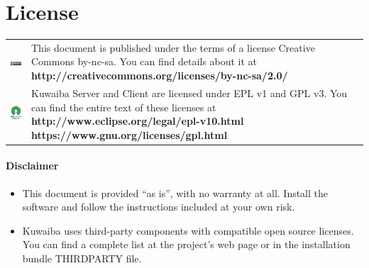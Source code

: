 \documentclass[a4paper]{article}
\begin{document}
	\clearpage
	\section{License}
		\begin{table}[ht]
			\centering
			\begin{tabular}{cp{10cm}}
				
				\includegraphics[]{img/cc_license_logo.jpg} & This document is published under the terms of a license Creative Commons by-nc-sa. You can find details about it at\linebreak
				\textbf{http://creativecommons.org/licenses/by-nc-sa/2.0/ } \\

				\includegraphics[width=2cm]{img/osi_logo.jpg} & Kuwaiba Server and Client are licensed under EPL v1 and GPL v3. You can find the entire text of these licenses at \linebreak
				\textbf{http://www.eclipse.org/legal/epl-v10.html} \linebreak
				\textbf{https://www.gnu.org/licenses/gpl.html} \\
			\end{tabular}
		\end{table}
		\paragraph{Disclaimer} \hspace{0pt}
		\begin{itemize}
			
			
			\item This document is provided “as is”, with no warranty at all. Install the software and follow the instructions included at your own risk.
			
			\item Kuwaiba uses third-party components with compatible open source licenses. You can find a complete list at the project's web page or in the installation bundle THIRDPARTY file.
		\end{itemize}
	
	\clearpage
\end{document}
